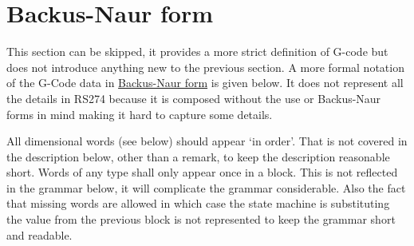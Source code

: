 \section{Backus-Naur form}
This section can be skipped, it provides a more strict definition of G-code but does not introduce anything new to
the previous section. A more formal notation of the G-Code data in
\href{https://en.wikipedia.org/wiki/Backus%E2%80%93Naur_form}{Backus-Naur form} is given below. It does not represent
all the details in RS274 because it is composed without the use or Backus-Naur forms in mind making it hard to capture
some details.

All dimensional words (see below) should appear `in order'. That is not covered in the description below, other than
a remark, to keep the description reasonable short. Words of any type shall only appear once in a block. This is not
reflected in the grammar below, it will complicate the grammar considerable. Also the fact that missing words are
allowed in which case the state machine is substituting the value from the previous block is not represented  to keep
the grammar short and readable.
